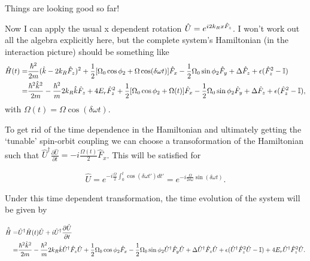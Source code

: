 Things are looking good so far!

Now I can apply the usual x dependent rotation $\hat{U} = e^{i2{{k_R}} x \hat{F}_z}$. I won't work out all the algebra explicitly here, but the complete system's Hamiltonian (in the interaction picture) should be something like
%
%
\begin{align}
	\begin{split}
		\hat{H}(t) = & \frac{\hbar^2}{2m}(\hat{k}-2{{k_R}}\hat{F}_z)^2 + \frac{1}{2}[\Omega_0\cos\phi_2 + \Omega\cos(\delta\omega t)]\hat{F}_x - \frac{1}{2}\Omega_0\sin\phi_2\hat{F}_y +\Delta\hat{F}_z + \epsilon(\hat{F}_z^2-\mathbb{I}) \\
		= &\frac{\hbar^2\hat{k}^2}{2m} - \frac{\hbar^2}{m}2{{k_R}} \hat{k}\hat{F}_z +4E_r\hat{F}_z^2 + \frac{1}{2}[\Omega_0\cos\phi_2 + \Omega(t)]\hat{F}_x - \frac{1}{2}\Omega_0\sin\phi_2\hat{F}_y + \Delta\hat{F}_z +
		\epsilon(\hat{F}_z^2-\mathbb{I}) ,
	\end{split}
\end{align}
%
%
with $\Omega(t)=\Omega\cos(\delta\omega t)$.

To get rid of the time dependence in the Hamiltonian and ultimately getting the `tunable' spin-orbit coupling we can choose a transoformation of the Hamiltonian such that $\hat{U}^{\dagger} \frac{\partial\hat{U}}{\partial t} = -i \frac{\Omega(t)}{2}\hat{F}_x$. This will be satisfied for

\begin{align}
	\hat{U} = e^{-i\frac{\Omega}{2}\int_0^t\cos(\delta\omega t')dt'} = e^{-i\frac{\Omega}{2\delta\omega}\sin(\delta\omega t)}.
\end{align}

Under this time dependent transformation, the time evolution of the system will be given by
%

\begin{align}
	\begin{split}
		\hat{\tilde{H}} = & \hat{U}^{\dagger}\hat{H}(t)\hat{U} + i\hat{U}^{\dagger} \frac{\partial\hat{U}}{\partial t} \\
		=  &\frac{\hbar^2\hat{k}^2}{2m} - \frac{\hbar^2}{m}2{{k_R}}\hat{k}\hat{U}^{\dagger}\hat{F}_z\hat{U} + \frac{1}{2}\Omega_0\cos\phi_2\hat{F}_x - \frac{1}{2}\Omega_0\sin\phi_2\hat{U}^{\dagger}\hat{F}_y\hat{U} + \Delta\hat{U}^{\dagger}\hat{F}_z\hat{U} + \epsilon(\hat{U}^{\dagger}\hat{F}_z^2\hat{U}-\mathbb{I})+4E_r \hat{U}^{\dagger}\hat{F}_z^2\hat{U}.
	\end{split}
\end{align}

